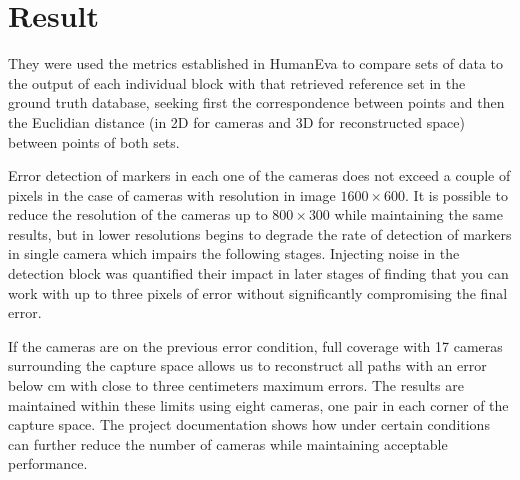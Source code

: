 \section{Result}

They were used the metrics established in HumanEva \cite{humaneva} to compare sets of data to the output of each individual block with that retrieved reference set in the ground truth database, seeking first the correspondence between points and then the Euclidian distance (in 2D for cameras and 3D for 
reconstructed space) between points of both sets.

Error detection of markers in each one of the cameras does not exceed a couple of pixels in the case of cameras with resolution in image $1600\times600$. It is possible to reduce the resolution of the cameras up to $800\times300$ while maintaining the same results, but in lower resolutions begins to degrade the rate of detection of markers in single camera which impairs the following stages. Injecting noise in the detection block was quantified their impact in later stages of finding that you can work with up to three pixels of error without significantly compromising the final error.

If the cameras are on the previous error condition, full coverage with 17 cameras surrounding the capture space allows us to reconstruct all paths with an error below cm with close to three centimeters maximum errors. The results are maintained within these limits using eight cameras, one pair in each corner of the capture space.
 The project documentation \cite{proyecto_biomecanica} shows how under certain conditions can further reduce the number of cameras while maintaining acceptable performance.

